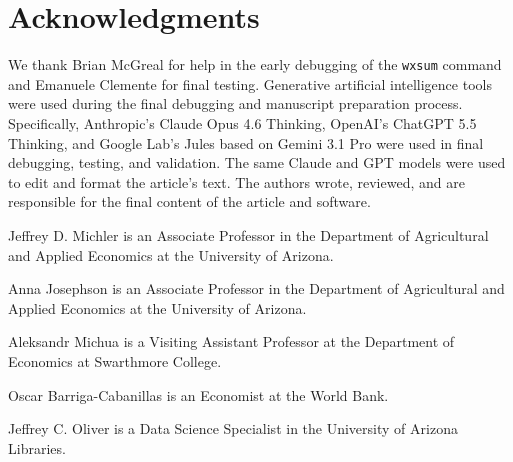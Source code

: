 


\section*{Acknowledgments}
We thank Brian McGreal for help in the early debugging of the \texttt{wxsum} command and Emanuele Clemente for final testing. Generative artificial intelligence tools were used during the final debugging and manuscript preparation process. Specifically, Anthropic's Claude Opus 4.6 Thinking, OpenAI's ChatGPT 5.5 Thinking, and Google Lab's Jules based on Gemini 3.1 Pro were used in final debugging, testing, and validation. The same Claude and GPT models were used to edit and format the article's text. The authors wrote, reviewed, and are responsible for the final content of the article and software.

\begin{aboutauthors}
Jeffrey D. Michler is an Associate Professor in the Department of Agricultural and Applied Economics at the University of Arizona.

Anna Josephson is an Associate Professor in the Department of Agricultural and Applied Economics at the University of Arizona.

Aleksandr Michua is a Visiting Assistant Professor at the Department of Economics at Swarthmore College.

Oscar Barriga-Cabanillas is an Economist at the World Bank.

Jeffrey C. Oliver is a Data Science Specialist in the University of Arizona Libraries.

\end{aboutauthors}

\endinput
